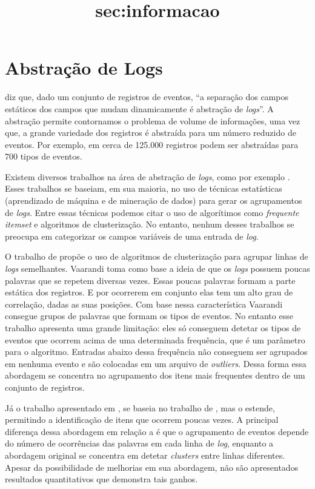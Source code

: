 \documentclass[
	12pt,				%
	openright,			%
	twoside,			%
	a4paper,			%
	english,			%
	spanish,			%
	brazil,				%
	]{abntex2}
\begin{document}
\section{Abstração de Logs}\title{sec:informacao}
\cite{nagappan2010abstracting} diz que, dado um conjunto de registros de eventos, ``a separação dos campos estáticos dos campos que mudam dinamicamente é abstração de \emph{logs}''. A abstração permite contornamos o problema de volume de informações, uma vez que, a grande variedade dos registros é abstraída para um número reduzido de eventos. Por exemplo, em \cite{nagappan2010abstracting} cerca de  125.000 registros podem ser abstraídas para 700 tipos de eventos.

Existem diversos trabalhos na área de abstração de \emph{logs}, como por exemplo \cite{jiang2008automated, nagappan2010abstracting, vaarandi2003data, xu2009detecting}. Esses trabalhos se baseiam, em sua maioria, no uso de técnicas estatísticas (aprendizado de máquina e de mineração de dados) para gerar os agrupamentos de \emph{logs}. Entre essas técnicas podemos citar o uso de algorítimos como \emph{frequente itemset} e algoritmos de clusterização. No entanto, nenhum desses trabalhos se preocupa em categorizar os campos variáveis de uma entrada de \emph{log}.

O trabalho de \cite{vaarandi2003data} propõe o uso de algoritmos de clusterização para agrupar linhas de \emph{logs} semelhantes. Vaarandi toma como base a ideia de que os \emph{logs} possuem poucas palavras que se repetem diversas vezes. Essas poucas palavras formam a parte estática dos registros. E por ocorrerem em conjunto elas tem um alto grau de correlação, dadas as suas posições. Com base nessa característica Vaarandi consegue grupos de palavras que formam os tipos de eventos. No entanto esse trabalho apresenta uma grande limitação: eles só conseguem detetar os tipos de eventos que ocorrem acima de uma determinada frequência, que é um parâmetro para o algoritmo. Entradas abaixo dessa frequência não conseguem ser agrupados em nenhuma evento e são colocadas em um arquivo de \emph{outliers}. Dessa forma essa abordagem se concentra no agrupamento dos itens mais frequentes dentro de um conjunto de registros.

Já o trabalho apresentado em \cite{nagappan2010abstracting}, se baseia no trabalho de \cite{vaarandi2003data}, mas o estende, permitindo a identificação de itens que ocorrem poucas vezes. A principal diferença dessa abordagem em relação a \cite{vaarandi2003data} é que o agrupamento de eventos depende do número de ocorrências das palavras em cada linha de \emph{log}, enquanto a abordagem original se concentra em detetar \emph{clusters} entre linhas diferentes. Apesar da possibilidade de melhorias em sua abordagem, não são apresentados resultados quantitativos que demonstra tais ganhos.
\end{document}
